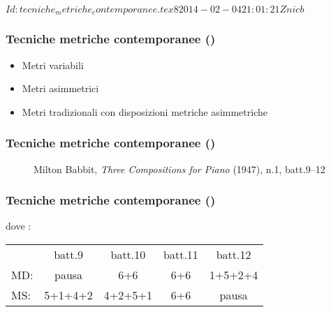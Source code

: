 %
%
\svnInfo $Id: tecniche_metriche_contemporanee.tex 8 2014-02-04 21:01:21Z nicb $

\setcounter{ms}{0}
\begin{frame}
    \frametitle{Tecniche metriche contemporanee ()}

    \begin{itemize}

        \item Metri variabili

        \item Metri asimmetrici

        \item Metri tradizionali con disposizioni metriche asimmetriche

    \end{itemize}

\end{frame}

\begin{frame}
    \frametitle{Tecniche metriche contemporanee ()}

    \begin{center}
        \begin{figure}
            \caption{Milton Babbit, \emph{Three Compositions for Piano} (1947), n.1, batt.9--12}
        \end{figure}
    \end{center}

\end{frame}

\begin{frame}
    \frametitle{Tecniche metriche contemporanee ()}

    dove :

    \begin{tabular}{l *{4}{c}}
             & batt.9 & batt.10 & batt.11 & batt.12\\
        MD:  & pausa  & 6+6     & 6+6     & 1+5+2+4\\
        MS:  & 5+1+4+2 & 4+2+5+1 & 6+6     & pausa\\
    \end{tabular}

\end{frame}

